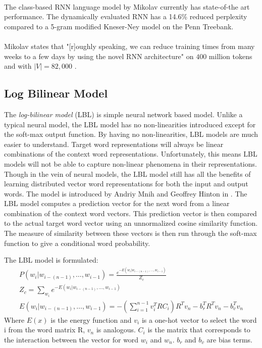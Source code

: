 \documentclass[12pt]{ociamthesis}
\begin{document}
\paragraph{}
The class-based RNN language model by Mikolav \cite{Mikolav2012} currently has state-of-the art performance. The dynamically evaluated RNN has a 14.6\% reduced perplexity compared to a 5-gram modified Kneser-Ney model on the Penn Treebank.
\paragraph{}
Mikolav states that "[r]oughly speaking, we can reduce training times from many weeks to a few days by using the novel RNN architecture" on $400$ million tokens and with $|V|=82,000$ \cite[pg. 93]{Mikolav2012}. 

\subsection{Log Bilinear Model} \label{sec:lbl}
The \emph{log-bilinear model} (LBL) is simple neural network based model. Unlike a typical neural model, the LBL model has no non-linearities introduced except for the soft-max output function. By having no non-linearities, LBL models are much easier to understand. Target word representations will always be linear combinations of the context word representations. Unfortunately, this means LBL models will not be able to capture non-linear phenomena in their representations. Though in the vein of neural models,  the LBL model still has all the benefits of learning distributed vector word representations for both the input and output words. The model is introduced by Andriy Mnih and Geoffrey Hinton in \cite{MnihHinton2007}. The LBL model computes a prediction vector for the next word from a linear combination of the context word vectors. This prediction vector is then compared to the actual target word vector using an unnormalized cosine similarity function. The measure of similarity between these vectors is then run through the soft-max function to give a conditional word probability.

The LBL model is formulated:
\begin{align}
P(w_i | w_{i-(n-1)},\dots, w_{i-1})  = \frac{e^{-E(w_i | w_{i-(n-1)},\dots, w_{i-1})}}{Z_c}
\\Z_c = \sum_{w_i} e^{-E(w_i | w_{i-(n-1)},\dots, w_{i-1})}
\\E(w_i | w_{i-(n-1)},\dots, w_{i-1}) = - \left( \sum_{i=1}^{n-1} v_i^T R C_i  \right) R^T v_n - b_r^T R^T v_n - b_v^T v_n
\end{align}
Where $E(x)$ is the energy function and $v_i$ is a one-hot vector to select the word i from the word matrix R, $v_n$ is analogous. $C_i$ is the matrix that corresponds to the interaction between the vector for word $w_i$ and $w_n$. $b_r$ and $b_v$ are bias terms.
\end{document}
